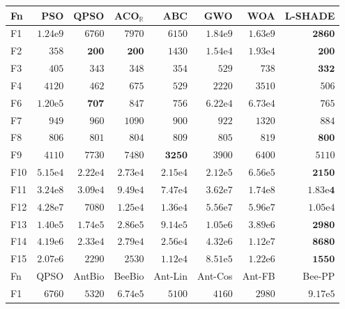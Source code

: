 \begin{tabular}{lrrrrrrr}
\toprule
Fn & PSO & QPSO & ACO$_\mathbb{R}$ & ABC & GWO & WOA & L-SHADE \\
\midrule
F1 & $1.24\mathrm{e}{9}$ & $6760$ & $7970$ & $6150$ & $1.84\mathrm{e}{9}$ & $1.63\mathrm{e}{9}$ & $\mathbf{2860}$ \\
F2 & $358$ & $\mathbf{200}$ & $\mathbf{200}$ & $1430$ & $1.54\mathrm{e}{4}$ & $1.93\mathrm{e}{4}$ & $\mathbf{200}$ \\
F3 & $405$ & $343$ & $348$ & $354$ & $529$ & $738$ & $\mathbf{332}$ \\
F4 & $4120$ & $462$ & $675$ & $529$ & $2220$ & $3510$ & $506$ \\
F6 & $1.20\mathrm{e}{5}$ & $\mathbf{707}$ & $847$ & $756$ & $6.22\mathrm{e}{4}$ & $6.73\mathrm{e}{4}$ & $765$ \\
F7 & $949$ & $960$ & $1090$ & $900$ & $922$ & $1320$ & $884$ \\
F8 & $806$ & $801$ & $804$ & $809$ & $805$ & $819$ & $\mathbf{800}$ \\
F9 & $4110$ & $7730$ & $7480$ & $\mathbf{3250}$ & $3900$ & $6400$ & $5110$ \\
F10 & $5.15\mathrm{e}{4}$ & $2.22\mathrm{e}{4}$ & $2.73\mathrm{e}{4}$ & $2.15\mathrm{e}{4}$ & $2.12\mathrm{e}{5}$ & $6.56\mathrm{e}{5}$ & $\mathbf{2150}$ \\
F11 & $3.24\mathrm{e}{8}$ & $3.09\mathrm{e}{4}$ & $9.49\mathrm{e}{4}$ & $7.47\mathrm{e}{4}$ & $3.62\mathrm{e}{7}$ & $1.74\mathrm{e}{8}$ & $\mathbf{1.83\mathrm{e}{4}}$ \\
F12 & $4.28\mathrm{e}{7}$ & $7080$ & $1.25\mathrm{e}{4}$ & $1.36\mathrm{e}{4}$ & $5.56\mathrm{e}{7}$ & $5.96\mathrm{e}{7}$ & $1.05\mathrm{e}{4}$ \\
F13 & $1.40\mathrm{e}{5}$ & $1.74\mathrm{e}{5}$ & $2.86\mathrm{e}{5}$ & $9.14\mathrm{e}{5}$ & $1.05\mathrm{e}{6}$ & $3.89\mathrm{e}{6}$ & $\mathbf{2980}$ \\
F14 & $4.19\mathrm{e}{6}$ & $2.33\mathrm{e}{4}$ & $2.79\mathrm{e}{4}$ & $2.56\mathrm{e}{4}$ & $4.32\mathrm{e}{6}$ & $1.12\mathrm{e}{7}$ & $\mathbf{8680}$ \\
F15 & $2.07\mathrm{e}{6}$ & $2290$ & $2530$ & $1.12\mathrm{e}{4}$ & $8.51\mathrm{e}{5}$ & $1.22\mathrm{e}{6}$ & $\mathbf{1550}$ \\
\midrule
Fn & QPSO & AntBio & BeeBio & Ant-Lin & Ant-Cos & Ant-FB & Bee-PP \\
\midrule
F1 & $6760$ & $5320$ & $6.74\mathrm{e}{5}$ & $5100$ & $4160$ & $2980$ & $9.17\mathrm{e}{5}$ \\

\end{tabular}
